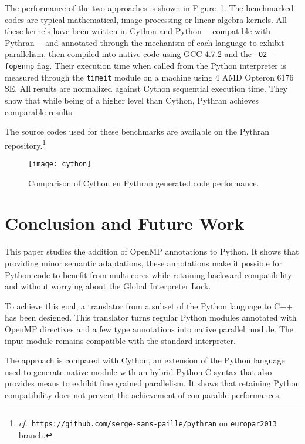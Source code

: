 \documentclass{llncs}
\newcommand\see{\emph{cf.\ }}
\begin{document}
The performance of the two approaches is shown in
Figure~\ref{fig:cython-pythran}.  The benchmarked codes are typical
mathematical, image-processing or linear algebra kernels. All these kernels
have been written in Cython and Python ---compatible with Pythran--- and
annotated through the mechanism of each language to exhibit parallelism, then
compiled into native code using GCC 4.7.2 and the \texttt{-O2 -fopenmp} flag.
Their execution time when called from the Python interpreter is measured
through the \texttt{timeit} module on a machine using 4 AMD Opteron 6176 SE.
All results are normalized against Cython sequential execution time. They show
that while being of a higher level than Cython, Pythran achieves comparable
results.

The source codes used for these benchmarks are available on the Pythran
repository.\footnote{\see \texttt{https://github.com/serge-sans-paille/pythran} on \texttt{europar2013}
branch.} 

\begin{figure}[ht]
    \texttt{[image: cython]}
    \caption{Comparison of Cython en Pythran generated code performance.}
    \label{fig:cython-pythran}
\end{figure}




\section{Conclusion and Future Work}

This paper studies the addition of OpenMP annotations to Python. It shows that
providing minor semantic adaptations, these annotations make it possible for
Python code to benefit from multi-cores while retaining backward compatibility
and without worrying about the Global Interpreter Lock.

To achieve this goal, a translator from a subset of the Python language to C++
has been designed. This translator turns regular Python modules annotated with
OpenMP directives and a few type annotations into native parallel module. The
input module remains compatible with the standard interpreter.

The approach is compared with Cython, an extension of the Python language used
to generate native module with an hybrid Python-C syntax that also provides
means to exhibit fine grained parallelism. It shows that retaining Python
compatibility does not prevent the achievement of comparable performances.
\end{document}
